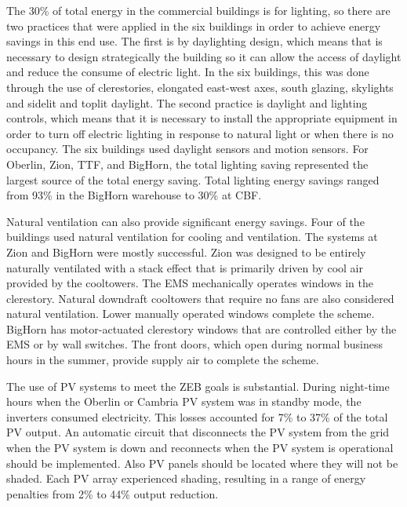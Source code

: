 The 30\% of total energy in the commercial buildings is for lighting, so there are two practices that were applied in the six buildings in order to achieve energy savings in this end use. The first is by daylighting design, which means that is necessary to design strategically the building so it can allow the access of daylight and reduce the consume of electric light. In the six buildings, this was done through the use of clerestories, elongated east-west axes, south glazing, skylights and sidelit and toplit daylight. The second practice is daylight and lighting controls, which means that it is necessary to install the appropriate equipment in order to turn off electric lighting in response to natural light or when there is no occupancy. The six buildings used daylight sensors and motion sensors. For Oberlin, Zion, TTF, and BigHorn, the total lighting saving represented the largest source of the total energy saving. Total lighting energy savings ranged from 93\% in the BigHorn warehouse to 30\% at CBF. 

Natural ventilation can also provide significant energy savings. Four of the buildings used natural ventilation for cooling and ventilation. The systems at Zion and BigHorn were mostly successful. Zion was designed to be entirely naturally ventilated with a stack effect that is primarily driven by cool air provided by the cooltowers. The EMS mechanically operates windows in the clerestory. Natural downdraft cooltowers that require no fans are also considered natural ventilation. Lower manually operated windows complete the scheme. BigHorn has motor-actuated clerestory windows that are controlled either by the EMS or by wall switches. The front doors, which open during normal business hours in the summer, provide supply air to complete the scheme. 

The use of PV systems to meet the ZEB goals is substantial. During night-time hours when the Oberlin or Cambria PV system was in standby mode, the inverters consumed electricity. This losses accounted for 7\% to 37\% of the total PV output. An automatic circuit that disconnects the PV system from the grid when the PV system is down and reconnects when the PV system is operational should be implemented. Also PV panels should be located where they will not be shaded. Each PV array experienced shading, resulting in a range of energy penalties from 2\% to 44\% output reduction.

